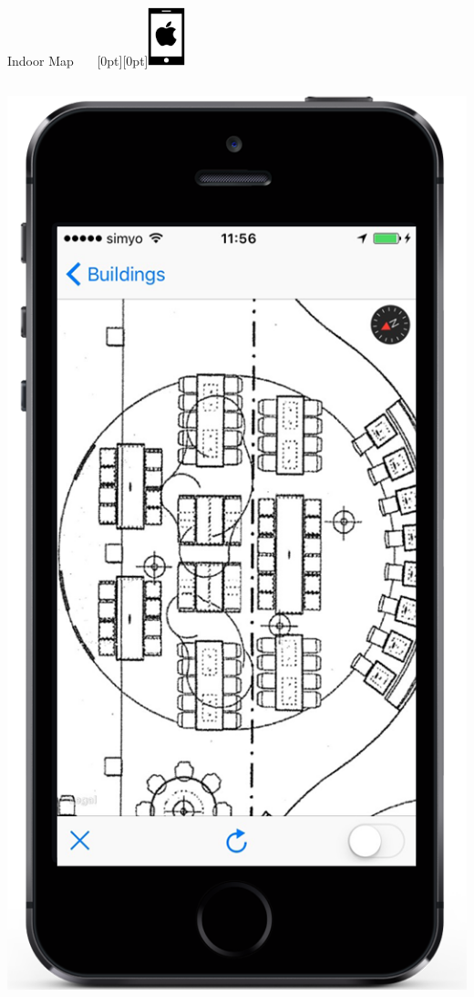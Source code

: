 \documentclass[11pt]{beamer}
\begin{document}
\begin{frame}{Indoor Map ~~~\raisebox{-10pt}[0pt][0pt]{\includegraphics[width=0.08\textwidth]{tech-stack-apple}}}
\begin{columns}[T]
\begin{column}{.4\textwidth}
  \includegraphics[scale=0.25]{mapzoomlevel}
  \end{column}
\end{columns}

\end{frame}
\end{document}
